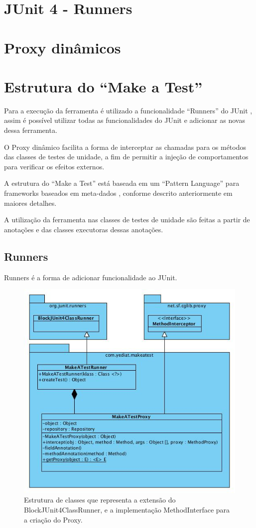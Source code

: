 \documentclass{abnt}
\begin{document}
\section{JUnit 4 - Runners}
\section{Proxy dinâmicos}
\section{Estrutura do ``Make a Test''}

Para a execução da ferramenta é utilizado a funcionalidade ``Runners'' do JUnit \cite{junit}, assim é possível utilizar todas as funcionalidades do JUnit e adicionar as novas dessa ferramenta.

O Proxy dinâmico facilita a forma de interceptar as chamadas para os métodos das classes de testes de unidade, a fim de permitir a injeção de comportamentos para verificar os efeitos externos.

A estrutura do ``Make a Test'' está baseada em um ``Pattern Language'' para frameworks baseados em meta-dados \cite{GUERRA-PATTERN}, conforme descrito anteriormente em maiores detalhes.

A utilização da ferramenta nas classes de testes de unidade são feitas a partir de anotações e das classes executoras dessas anotações.

\subsection{Runners}

Runners é a forma de adicionar funcionalidade ao JUnit.

\begin{figure}[!ht]
	\centering
	\includegraphics[scale=0.50]{uml/runners.jpg}
	\caption{Estrutura de classes que representa a extensão do BlockJUnit4ClassRunner, e a implementação MethodInterface para a criação do Proxy.}
	\label{uml-class-runners}
\end{figure}
\end{document}
